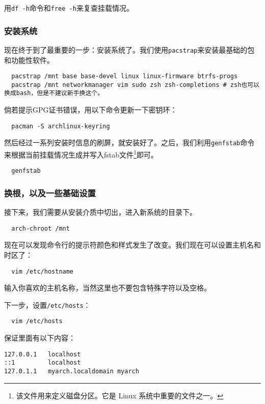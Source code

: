 \documentclass[../main.tex]{subfiles}
\begin{document}
用\texttt{df -h}命令和\texttt{free -h}来复查挂载情况。

\subsubsection{安装系统}

现在终于到了最重要的一步：安装系统了。我们使用\texttt{pacstrap}来安装最基础的包和功能性软件。

\begin{lstlisting}
  pacstrap /mnt base base-devel linux linux-firmware btrfs-progs
  pacstrap /mnt networkmanager vim sudo zsh zsh-completions # zsh也可以换成bash，但是不建议新手换这个。
\end{lstlisting}

倘若提示GPG证书错误，用以下命令更新一下密钥环：

\begin{lstlisting}
  pacman -S archlinux-keyring
\end{lstlisting}

然后经过一系列安装时信息的刷屏，就安装好了。之后，我们利用\texttt{genfstab}命令来根据当前挂载情况生成并写入fstab文件\footnote{该文件用来定义磁盘分区。它是 Linux 系统中重要的文件之一。}即可。

\begin{lstlisting}
  genfstab
\end{lstlisting}

\subsubsection{换根，以及一些基础设置}

接下来，我们需要从安装介质中切出，进入新系统的目录下。

\begin{lstlisting}
  arch-chroot /mnt
\end{lstlisting}

现在可以发现命令行的提示符颜色和样式发生了改变。我们现在可以设置主机名和时区了：
\begin{lstlisting}
  vim /etc/hostname
\end{lstlisting}
输入你喜欢的主机名称，当然这里也不要包含特殊字符以及空格。

下一步，设置\texttt{/etc/hosts}：
\begin{lstlisting}
  vim /etc/hosts
\end{lstlisting}
保证里面有以下内容：
\begin{lstlisting}
127.0.0.1   localhost
::1         localhost
127.0.1.1   myarch.localdomain myarch
\end{lstlisting}
\end{document}
